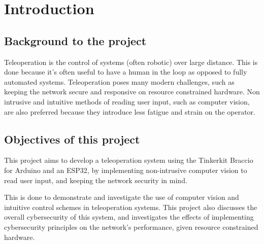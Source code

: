 \chapter{Introduction}

\section{Background to the project}
Teleoperation is the control of systems (often robotic) over large distance. This is done because it's often useful to have a human in the loop as opposed to fully automated systems. Teleoperation poses many modern challenges, such as keeping the network secure and responsive on resource constrained hardware. Non intrusive and intuitive methods of reading user input, such as computer vision, are also preferred because they introduce less fatigue and strain on the operator.

\section{Objectives of this project}
This project aims to develop a teleoperation system using the Tinkerkit Braccio for Arduino and an ESP32, by implementing non-intrusive computer vision to read user input, and keeping the network security in mind.

This is done to demonstrate and investigate the use of computer vision and intuitive control schemes in teleoperation systems. This project also discusses the overall cybersecurity of this system, and investigates the effects of implementing cybersecurity principles on the network's performance, given resource constrained hardware.

